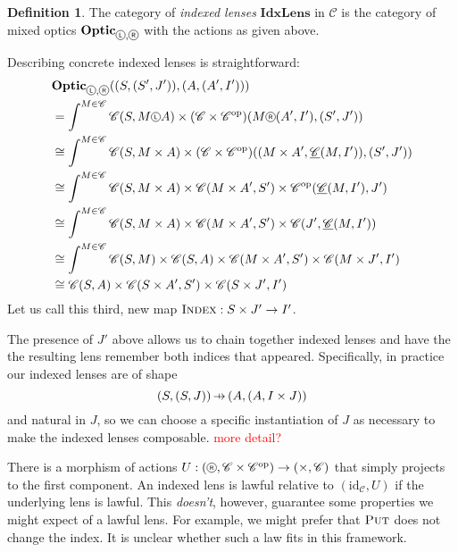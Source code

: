 \documentclass[11pt,letterpaper]{article}
\theoremstyle{plain}
\theoremstyle{definition}
\newtheorem{definition}[theorem]{Definition}
\newcommand{\C}{\mathscr{C}}
\newcommand{\homC}{\underline{\C}}
\newcommand{\Optic}{\mathbf{Optic}}
\newcommand{\IdxLens}{\mathbf{IdxLens}}
\newcommand{\id}{\mathrm{id}}
\newcommand{\op}{\mathrm{op}}
\newcommand*\circled[1]{\tikz[baseline={([yshift=-0.65ex]current bounding box.center)}]{
   \node[shape=circle,draw,inner sep=1pt] (char) {#1};}}
\newcommand{\actL}{{\circled{\tiny$\mathsf{L}$}}}
\newcommand{\actR}{{\circled{\tiny$\mathsf{R}$}}}
\newcommand{\fput}{\textsc{Put}}
\newcommand{\findex}{\textsc{Index}}
\newcommand{\hto}{\ensuremath{\,\mathaccent\shortmid\rightarrow\,}}
\newcommand{\todo}[1]{\textcolor{red}{\small #1}}
\begin{document}
\begin{definition}
The category of \emph{indexed lenses} $\IdxLens$ in $\C$ is the category of mixed optics $\Optic_{\actL, \actR}$ with the actions as given above.
\end{definition}
Describing concrete indexed lenses is straightforward:
\begin{align*}
  &\Optic_{\actL, \actR}((S, (S', J')), (A, (A', I'))) \\
  &= \int^{M \in \C} \C(S, M \actL A) \times (\C \times \C^\op)(M \actR (A', I'), (S', J')) \\
  &\cong \int^{M \in \C} \C(S, M \times A) \times (\C \times \C^\op)((M \times A', \homC(M, I')), (S', J')) \\
  &\cong \int^{M \in \C} \C(S, M \times A) \times \C(M \times A', S') \times \C^\op(\homC(M, I'), J') \\
  &\cong \int^{M \in \C} \C(S, M \times A) \times \C(M \times A', S') \times \C(J', \homC(M, I')) \\
  &\cong \int^{M \in \C} \C(S, M) \times \C(S, A) \times \C(M \times A', S') \times \C(M \times J', I') \\
  &\cong \C(S, A) \times \C(S \times A', S') \times \C(S \times J', I')
\end{align*}
Let us call this third, new map $\findex : S \times J' \to I'$.

The presence of $J'$ above allows us to chain together indexed lenses and have the the resulting lens remember both indices that appeared. Specifically, in practice our indexed lenses are of shape
\[ 
(S, (S, J)) \hto (A, (A, I \times J))
\]
and natural in $J$, so we can choose a specific instantiation of $J$ as necessary to make the indexed lenses composable. \todo{more detail?}

There is a morphism of actions $U : (\actR, \C \times \C^\op) \to (\times, \C)$ that simply projects to the first component. An indexed lens is lawful relative to $(\id_\C, U)$ if the underlying lens is lawful. This \emph{doesn't}, however, guarantee some properties we might expect of a lawful lens. For example, we might prefer that $\fput$ does not change the index. It is unclear whether such a law fits in this framework.
\end{document}
